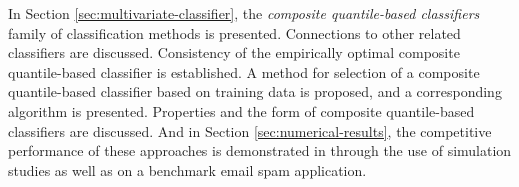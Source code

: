 In Section \ref{sec:multivariate-classifier}, the \emph{composite quantile-based
  classifiers} family of classification methods is presented.  Connections to
other related classifiers are discussed.  Consistency of the empirically optimal
composite quantile-based classifier is established.  A method for selection of a
composite quantile-based classifier based on training data is proposed, and a
corresponding algorithm is presented.  Properties and the form of composite
quantile-based classifiers are discussed.  And in Section
\ref{sec:numerical-results}, the competitive performance of these approaches is
demonstrated in through the use of simulation studies as well as on a benchmark
email spam application.





